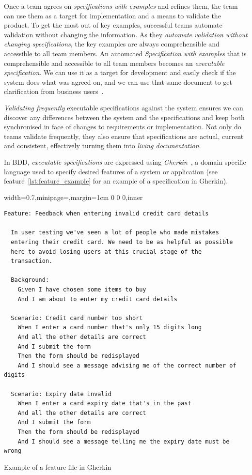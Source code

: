 \documentclass[dissertation,final]{softeng}
\newenvironment{featurecode}[1]
{ \lrbox\featurebox \begin{adjustbox}{width=#1\textwidth,minipage=\textwidth,margin=1cm 0 0 0,inner} }
{ \end{adjustbox}\endlrbox}
\newenvironment{featurelist}[2]
{
\newcommand{\setcaption}{\caption{#1}}
\newcommand{\setlabel}{\label{#2}}
}
{\begin{listing}[h!]\centering\usebox\featurebox\setcaption\setlabel\end{listing}}
\begin{document}
Once a team agrees on \emph{specifications with examples} and refines them, the team can use them as a target for implementation and a means to validate the product. To get the most out of key examples, successful teams automate validation without changing the information. As they\emph{ automate validation without changing specifications}, the key examples are always comprehensible and accessible to all team members. An automated \emph{Specification with examples} that is comprehensible and accessible to all team members becomes an \emph{executable specification}. We can use it as a target for development and easily check if the system does what was agreed on, and we can use that same document to get clarification from business users~\citep{Adzic201106}.

\emph{Validating frequently} executable specifications against the system ensures we can discover any differences between the system and the specifications and keep both synchronised in face of changes to requirements or implementation. Not only do teams validate frequently, they also ensure that specifications are actual, current and consistent, effectively turning them into \emph{living documentation}.

In BDD, \emph{executable specifications} are expressed using \emph{Gherkin}~\citep{wynne2012cucumber}, a domain specific language used to specify desired features of a system or application (see feature~\ref{lst:feature_example} for an example of a specification in Gherkin). 

\begin{featurelist}{Example of a feature file in Gherkin~\citep{wynne2012cucumber}}{lst:feature_example}
\begin{featurecode}{0.7}
\begin{verbatim}
Feature: Feedback when entering invalid credit card details

  In user testing we've seen a lot of people who made mistakes
  entering their credit card. We need to be as helpful as possible
  here to avoid losing users at this crucial stage of the
  transaction.

  Background:
    Given I have chosen some items to buy
    And I am about to enter my credit card details

  Scenario: Credit card number too short
    When I enter a card number that's only 15 digits long
    And all the other details are correct
    And I submit the form
    Then the form should be redisplayed
    And I should see a message advising me of the correct number of digits

  Scenario: Expiry date invalid
    When I enter a card expiry date that's in the past
    And all the other details are correct
    And I submit the form
    Then the form should be redisplayed
    And I should see a message telling me the expiry date must be wrong
\end{verbatim}
\end{featurecode}
\end{featurelist}
\end{document}
